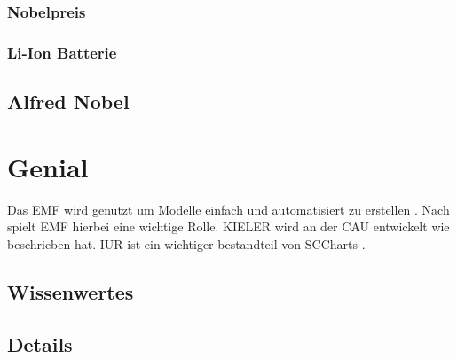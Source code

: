 \documentclass[12pt,titlepage]{scrartcl}
\begin{document}
\subsubsection{Nobelpreis}
\Blindtext

\subsubsection{Li-Ion Batterie}
\Blindtext

\subsection{Alfred Nobel}
\blindtext

\section{Genial}
Das \ac{EMF} wird genutzt um Modelle einfach und automatisiert zu erstellen \parencite[348\psq]{karg1969einfluss}.
Nach \textcite[347]{helmert2003n} spielt \ac{EMF} hierbei eine wichtige Rolle. \ac{KIELER} wird an der \ac{CAU} entwickelt \parencite[34\psqq]{weggler2050leguminosen} wie \textcite[200]{karg1965larvalsystematische} beschrieben hat.
\ac{IUR} ist ein wichtiger bestandteil von \ac{SCCharts} \parencites[235]{karg1985zwei}[88]{bellebaum2008rohricht}.
\subsection{Wissenwertes}
\blindtext

\subsection{Details}
\blindtext

\begin{singlespace} %
\begin{flushleft} %
\printbibliography[title=Literaturverzeichnis]
\end{flushleft}
\end{singlespace}

\end{document}
